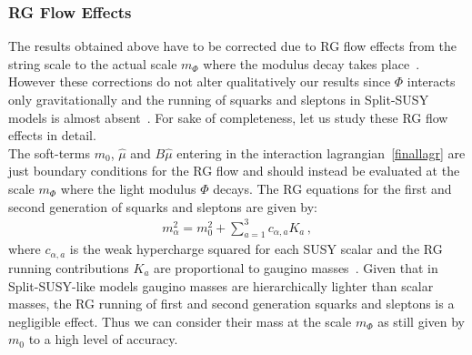 \documentclass[12pt,a4paper]{book}
\begin{document}
\subsubsection*{RG Flow Effects}
\label{rgflows}

The results obtained above have to be corrected due to RG flow effects from the string scale to the actual scale $m_\Phi$ where the modulus decay takes place~\cite{Angus:2013zfa}. However these corrections do not alter qualitatively our results since $\Phi$ interacts only gravitationally and the running of squarks and sleptons in Split-SUSY models is almost absent~\cite{Bagnaschi:2014rsa}. For sake of completeness, let us study these RG flow effects in detail.\\

The soft-terms $m_0$, $\hat\mu$ and $B\hat\mu$ entering in the interaction lagrangian~\eqref{finallagr} are just boundary conditions for the RG flow and should instead be evaluated at the scale $m_\Phi$ where the light modulus $\Phi$ decays. The RG equations for the first and second generation of squarks and sleptons are given by:
\begin{align}
m^2_\alpha = m_0^2 + \sum_{a=1}^3 c_{\alpha,a} K_a\,,
\end{align}
where $c_{\alpha,a}$ is the weak hypercharge squared for each SUSY scalar and the RG running contributions $K_a$ are proportional 
to gaugino masses~\cite{Martin:1997ns}. Given that in Split-SUSY-like models gaugino masses are hierarchically lighter than scalar masses, 
the RG running of first and second generation squarks and sleptons is a negligible effect. Thus we can consider their mass at the scale $m_\Phi$ as still given by $m_0$ to a high level of accuracy.\\
\end{document}
